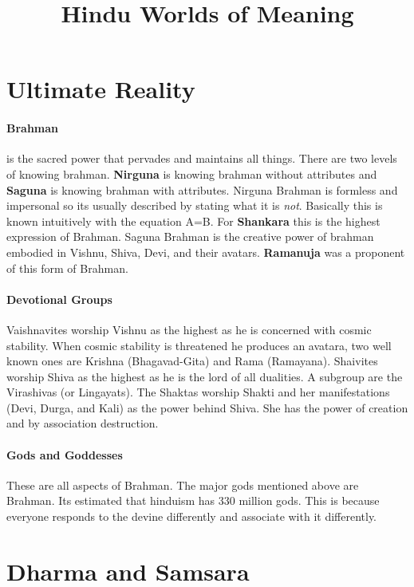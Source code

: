 \documentclass{article}
\begin{document}
\title{Hindu Worlds of Meaning}
\maketitle

\section*{Ultimate Reality}
\label{sec:ultimate_reality}
\paragraph{Brahman}
\label{par:brahman}
is the sacred power that pervades and maintains all things. There are two levels of knowing brahman. \textbf{Nirguna} is knowing brahman without attributes and \textbf{Saguna} is knowing brahman with attributes. Nirguna Brahman is formless and impersonal so its usually described by stating what it is \emph{not}. Basically this is known intuitively with the equation A=B. For \textbf{Shankara} this is the highest expression of Brahman. Saguna Brahman is the creative power of brahman embodied in Vishnu, Shiva, Devi, and their avatars. \textbf{Ramanuja} was a proponent of this form of Brahman.

\paragraph{Devotional Groups}
\label{par:devotional_groups}
Vaishnavites worship Vishnu as the highest as he is concerned with cosmic stability. When cosmic stability is threatened he produces an avatara, two well known ones are Krishna (Bhagavad-Gita) and Rama (Ramayana). Shaivites worship Shiva as the highest as he is the lord of all dualities. A subgroup are the Virashivas (or Lingayats). The Shaktas worship Shakti and her manifestations (Devi, Durga, and Kali) as the power behind Shiva. She has the power of creation and by association destruction.

\paragraph{Gods and Goddesses}
 \label{par:gods_and_goddesses}
These are all aspects of Brahman. The major gods mentioned above are Brahman. Its estimated that hinduism has 330 million gods. This is because everyone responds to the devine differently and associate with it differently.

\section*{Dharma and Samsara}
\label{sec:dharma_and_samsara}
\end{document}
